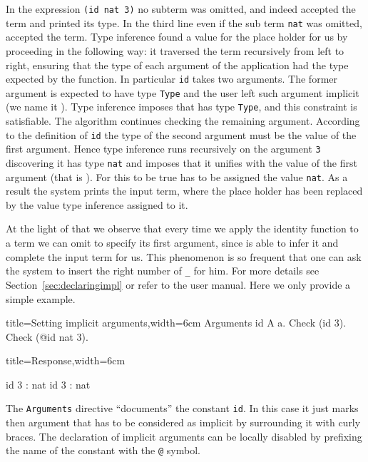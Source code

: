 In the expression \lstinline/(id nat 3)/ no subterm was omitted, and
indeed \Coq{} accepted the term and printed its type.  In the third
line even if the sub term \lstinline/nat/ was omitted, \Coq{} accepted
the term.  Type inference found a value for the place holder
for us by proceeding in the following way:  it traversed the term
recursively from left to right, ensuring that the type of each
argument of the application had the type expected by the function.  In
particular \lstinline/id/ takes two arguments.
The former argument is expected to have type \lstinline/Type/ and the
user left such argument implicit (we name it ).   Type
inference imposes that  has type \lstinline/Type/, and this
constraint is satisfiable.  The algorithm continues checking the
remaining argument.  According to the definition of \lstinline/id/ the type of
the second argument must be the value of the first argument.  Hence
type inference runs recursively on the argument \lstinline/3/
discovering it has type \lstinline/nat/ and imposes that it unifies
with the value of the first argument (that is ).  For this
to be true  has to be assigned the value \lstinline/nat/.
As a result the system prints the input term, where the place holder
has been replaced by the value type inference assigned to it.

At the light of that we observe that every time we apply the identity
function to a term we can omit to specify its first argument,
since \Coq{} is able to infer it and complete the input term for us.
This phenomenon is so frequent that one can ask the system to insert
the right number of \lstinline/_/ for him.  For more details see
Section~\ref{sec:declaringimpl} or refer to the user manual.  Here
we only provide a simple example.

\begin{coq}{title=Setting implicit arguments,width=6cm}
Arguments id {A} a.
Check (id 3).
Check (@id nat 3).
\end{coq}
\begin{coqout}{title=Response,width=6cm}

id 3 : nat
id 3 : nat
\end{coqout}

The \lstinline/Arguments/ directive ``documents'' the constant
\lstinline/id/.  In this case it just marks then argument that has to
be considered as implicit by surrounding it with curly braces.
The declaration of implicit arguments can be locally disabled by
prefixing the name of the constant with the \lstinline/@/ symbol.

